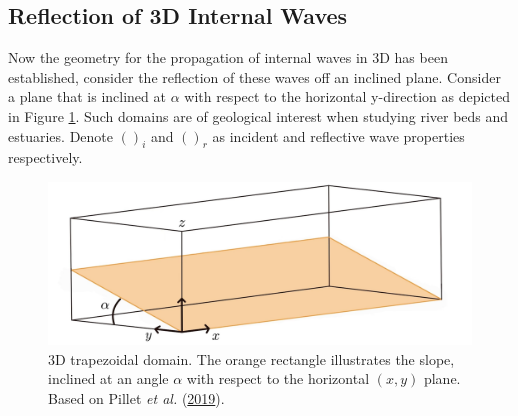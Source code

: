 \documentclass[a4paper]{article}
\numberwithin{equation}{section}
\begin{document}
\subsection{Reflection of 3D Internal Waves}
Now the geometry for the propagation of internal waves in 3D has been established, consider the reflection of these waves off an inclined plane. Consider a plane that is inclined at $\alpha$ with respect to the horizontal y-direction as depicted in Figure \ref{fig:14}. Such domains are of geological interest when studying river beds and estuaries. Denote $()_i$ and $()_r$ as incident and reflective wave properties respectively. 

\begin{figure}[h!]
  \includegraphics[scale=0.16, center]{Images/3d domain.png}
  \caption{3D trapezoidal domain. The orange rectangle illustrates the slope, inclined at an angle $\alpha$ with respect to the horizontal $(x,y)$ plane. Based on Pillet \emph{et al.} (\protect\hyperlink{ref 37}{2019}).}
  \label{fig:14}
\end{figure} 
\end{document}
